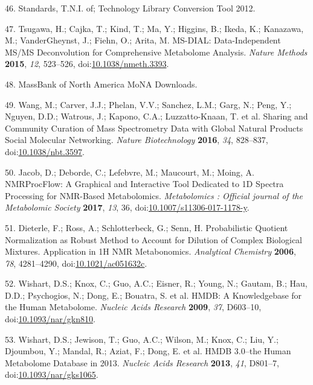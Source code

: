 \documentclass[]{article}
\begin{document}
\leavevmode\hypertarget{ref-thenationalinstituteofstandardsandtechnology_website_2012}{}%
46. Standards, T.N.I. of; Technology Library Conversion Tool 2012.

\leavevmode\hypertarget{ref-tsugawa_2015}{}%
47. Tsugawa, H.; Cajka, T.; Kind, T.; Ma, Y.; Higgins, B.; Ikeda, K.; Kanazawa, M.; VanderGheynst, J.; Fiehn, O.; Arita, M. MS-DIAL: Data-Independent MS/MS Deconvolution for Comprehensive Metabolome Analysis. \emph{Nature Methods} \textbf{2015}, \emph{12}, 523--526, doi:\href{https://doi.org/10.1038/nmeth.3393}{10.1038/nmeth.3393}.

\leavevmode\hypertarget{ref-massbankofnorthamerica_website_nd}{}%
48. MassBank of North America MoNA Downloads.

\leavevmode\hypertarget{ref-wang_2016}{}%
49. Wang, M.; Carver, J.J.; Phelan, V.V.; Sanchez, L.M.; Garg, N.; Peng, Y.; Nguyen, D.D.; Watrous, J.; Kapono, C.A.; Luzzatto-Knaan, T. et al. Sharing and Community Curation of Mass Spectrometry Data with Global Natural Products Social Molecular Networking. \emph{Nature Biotechnology} \textbf{2016}, \emph{34}, 828--837, doi:\href{https://doi.org/10.1038/nbt.3597}{10.1038/nbt.3597}.

\leavevmode\hypertarget{ref-jacob_2017}{}%
50. Jacob, D.; Deborde, C.; Lefebvre, M.; Maucourt, M.; Moing, A. NMRProcFlow: A Graphical and Interactive Tool Dedicated to 1D Spectra Processing for NMR-Based Metabolomics. \emph{Metabolomics : Official journal of the Metabolomic Society} \textbf{2017}, \emph{13}, 36, doi:\href{https://doi.org/10.1007/s11306-017-1178-y}{10.1007/s11306-017-1178-y}.

\leavevmode\hypertarget{ref-dieterle_2006}{}%
51. Dieterle, F.; Ross, A.; Schlotterbeck, G.; Senn, H. Probabilistic Quotient Normalization as Robust Method to Account for Dilution of Complex Biological Mixtures. Application in 1H NMR Metabonomics. \emph{Analytical Chemistry} \textbf{2006}, \emph{78}, 4281--4290, doi:\href{https://doi.org/10.1021/ac051632c}{10.1021/ac051632c}.

\leavevmode\hypertarget{ref-wishart_2009}{}%
52. Wishart, D.S.; Knox, C.; Guo, A.C.; Eisner, R.; Young, N.; Gautam, B.; Hau, D.D.; Psychogios, N.; Dong, E.; Bouatra, S. et al. HMDB: A Knowledgebase for the Human Metabolome. \emph{Nucleic Acids Research} \textbf{2009}, \emph{37}, D603--10, doi:\href{https://doi.org/10.1093/nar/gkn810}{10.1093/nar/gkn810}.

\leavevmode\hypertarget{ref-wishart_2013}{}%
53. Wishart, D.S.; Jewison, T.; Guo, A.C.; Wilson, M.; Knox, C.; Liu, Y.; Djoumbou, Y.; Mandal, R.; Aziat, F.; Dong, E. et al. HMDB 3.0--the Human Metabolome Database in 2013. \emph{Nucleic Acids Research} \textbf{2013}, \emph{41}, D801--7, doi:\href{https://doi.org/10.1093/nar/gks1065}{10.1093/nar/gks1065}.
\end{document}
